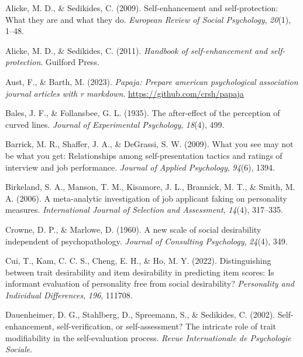 \documentclass[
  ,jou]{apa6}
\newlength{\cslhangindent}
\newlength{\cslentryspacingunit} %
\newenvironment{CSLReferences}[2] %
 {%
  \setlength{\parindent}{0pt}
  \ifodd #1
  \let\oldpar\par
  \def\par{\hangindent=\cslhangindent\oldpar}
  \fi
  \setlength{\parskip}{#2\cslentryspacingunit}
 }%
 {}
\begin{document}
\hypertarget{refs}{}
\begin{CSLReferences}{1}{0}
\leavevmode{}%
Alicke, M. D., \& Sedikides, C. (2009). Self-enhancement and self-protection: What they are and what they do. \emph{European Review of Social Psychology}, \emph{20}(1), 1--48.

\leavevmode{}%
Alicke, M. D., \& Sedikides, C. (2011). \emph{Handbook of self-enhancement and self-protection}. Guilford Press.

\leavevmode{}%
Aust, F., \& Barth, M. (2023). \emph{Papaja: Prepare american psychological association journal articles with r markdown}. \url{https://github.com/crsh/papaja}

\leavevmode{}%
Bales, J. F., \& Follansbee, G. L. (1935). The after-effect of the perception of curved lines. \emph{Journal of Experimental Psychology}, \emph{18}(4), 499.

\leavevmode{}%
Barrick, M. R., Shaffer, J. A., \& DeGrassi, S. W. (2009). What you see may not be what you get: Relationships among self-presentation tactics and ratings of interview and job performance. \emph{Journal of Applied Psychology}, \emph{94}(6), 1394.

\leavevmode{}%
Birkeland, S. A., Manson, T. M., Kisamore, J. L., Brannick, M. T., \& Smith, M. A. (2006). A meta-analytic investigation of job applicant faking on personality measures. \emph{International Journal of Selection and Assessment}, \emph{14}(4), 317--335.

\leavevmode{}%
Crowne, D. P., \& Marlowe, D. (1960). A new scale of social desirability independent of psychopathology. \emph{Journal of Consulting Psychology}, \emph{24}(4), 349.

\leavevmode{}%
Cui, T., Kam, C. C. S., Cheng, E. H., \& Ho, M. Y. (2022). Distinguishing between trait desirability and item desirability in predicting item scores: Is informant evaluation of personality free from social desirability? \emph{Personality and Individual Differences}, \emph{196}, 111708.

\leavevmode{}%
Dauenheimer, D. G., Stahlberg, D., Spreemann, S., \& Sedikides, C. (2002). Self-enhancement, self-verification, or self-assessment? The intricate role of trait modifiability in the self-evaluation process. \emph{Revue Internationale de Psychologie Sociale}.


\end{CSLReferences}
\end{document}
